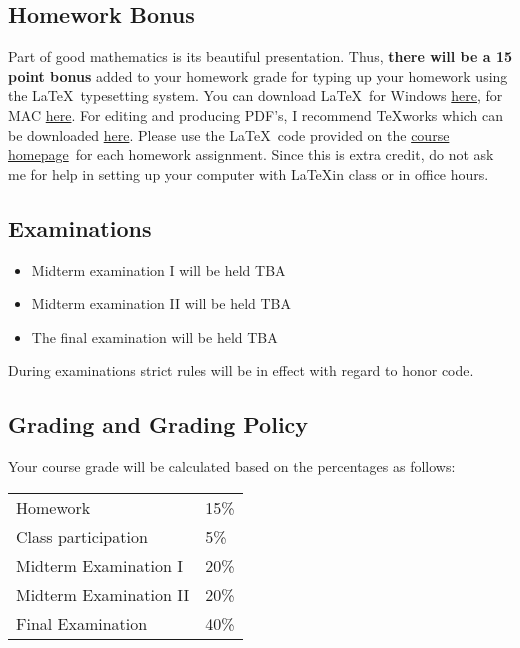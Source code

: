 \documentclass[12pt]{article}
\newcommand{\ingreen}[1]{\color{green}\textbf{#1} \color{black}}
\newcommand{\coursewebpage}{\href{https://github.com/kapelner/QC_Math_241_Fall_2014_15}{course homepage}}
\begin{document}
\subsection*{Homework Bonus}

Part of good mathematics is its beautiful presentation. Thus, \ingreen{there will be a 15 point bonus} added to your homework grade  for typing up your homework using the \LaTeX ~typesetting system. You can download \LaTeX ~for Windows \href{http://www.miktex.org/download}{here}, for MAC \href{http://www.tug.org/mactex/}{here}. For editing and producing PDF's, I recommend \TeX works which can be downloaded \href{http://www.tug.org/texworks/#Getting_TeXworks}{here}. Please use the \LaTeX ~code provided on the \coursewebpage ~for each homework assignment. Since this is extra credit, do not ask me for help in setting up your computer with \LaTeX in class or in office hours.

\subsection*{Examinations}

\begin{itemize}
\itemsep -0.0em 
\item Midterm examination I will be held TBA
\item Midterm examination II will be held TBA
\item The final examination will be held TBA
\end{itemize}

During examinations strict rules will be in effect with regard to honor code.

\subsection*{Grading and Grading Policy}

Your course grade will be calculated based on the percentages as follows: 

\begin{table}[htp]
\centering
\begin{tabular}{l|l}
Homework & 15\% \\
Class participation & 5\% \\
Midterm Examination I & 20\%\\
Midterm Examination II & 20\%\\
Final Examination & 40\%
\end{tabular}
\end{table}
\end{document}
